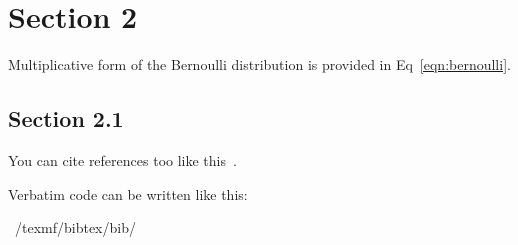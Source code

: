 \documentclass{quicknotes}
\begin{document}
\section{Section 2}
Multiplicative form of the Bernoulli distribution is provided in Eq~\ref{eqn:bernoulli}.

\subsection{Section 2.1}
You can cite references too like this~\cite{einstein1916foundation}.

Verbatim code can be written like this:
\begin{code}
~/texmf/bibtex/bib/
\end{code}



\end{document}
